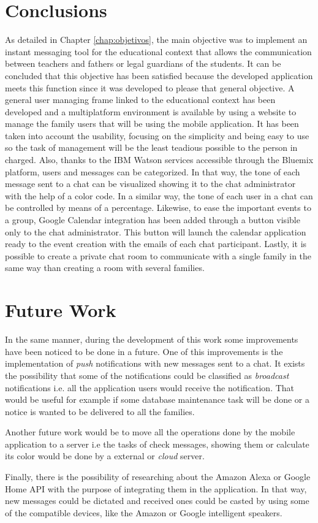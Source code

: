 \section{Conclusions}
As detailed in Chapter \ref{chap:objetivos}, the main objective was to implement an instant messaging tool for the educational context that allows the communication between teachers and fathers or \mbox{legal} guardians of the students. It can be concluded that this objective has been satisfied \mbox{because} the developed application meets this function since it was developed to please that general objective. A general user managing frame linked to the educational context has been developed and a multiplatform environment is available by using a website to manage the family users that will be using the mobile application. It has been taken into account the usability, focusing on the simplicity and being easy to use so the task of management will be the least teadious possible to the person in charged. Also, thanks to the IBM Watson services accessible through the Bluemix platform, users and messages can be categorized. In that way, the tone of each message sent to a chat can be visualized showing it to the chat administrator with the help of a color code. In a similar way, the tone of each user in a chat can be controlled by means of a percentage. Likewise, to ease the important events to a group, Google Calendar integration has been added through a button visible only to the chat administrator. This button will launch the calendar application ready to the event creation with the emails of each chat participant. Lastly, it is possible to create a private chat room to communicate with a single family in the same way than creating a room with several families.

\clearpage

\section{Future Work}
In the same manner, during the development of this work some improvements have been noticed to be done in a future. One of this improvements is the implementation of \textit{push} \mbox{notifications} with new messages sent to a chat. It exists the possibility that some of the notifications could be classified as \textit{broadcast} notifications i.e. all the application users would receive the notification. That would be useful for example if some database maintenance task will be done or a notice is wanted to be delivered to all the families.

Another future work would be to move all the operations done by the mobile application to a server i.e the tasks of check messages, showing them or calculate its color would be done by a external or \textit{cloud} server.

Finally, there is the possibility of researching about the Amazon Alexa or Google Home \acs{API} with the purpose of integrating them in the application. In that way, new messages could be dictated and received ones could be casted by using some of the compatible devices, like the Amazon or Google intelligent speakers.



